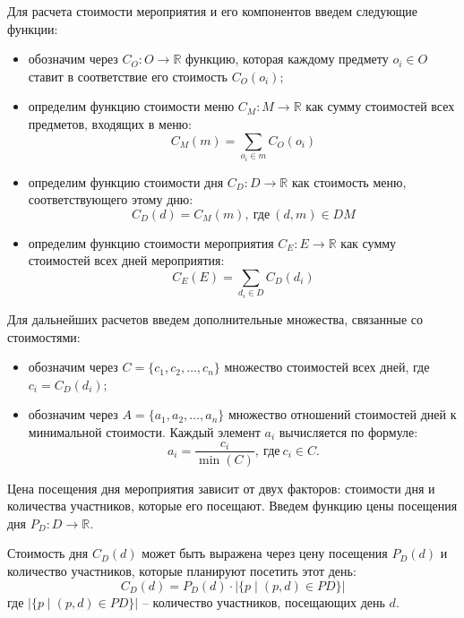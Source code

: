 Для расчета стоимости мероприятия и его компонентов введем следующие функции:
\begin{itemize}[label=--]
	\item обозначим через $C_O: O \rightarrow \mathbb{R}$ функцию, которая каждому предмету $o_i \in O$ ставит в соответствие его стоимость $C_O(o_i)$;
	\item определим функцию стоимости меню $C_M: M \rightarrow \mathbb{R}$ как сумму стоимостей всех предметов, входящих в меню: 
	\begin{equation}
		C_M(m) = \sum_{o_i \in m} C_O(o_i)
	\end{equation}
	\item определим функцию стоимости дня $C_D: D \rightarrow \mathbb{R}$ как стоимость меню, соответствующего этому дню:
	\begin{equation}
		C_D(d) = C_M(m), \ \text{где} \ (d, m) \in DM
	\end{equation}
	\item определим функцию стоимости мероприятия $C_E: E \rightarrow \mathbb{R}$ как сумму стоимостей всех дней мероприятия:
	\begin{equation}
		C_E(E) = \sum_{d_i \in D} C_D(d_i)
	\end{equation}
\end{itemize}

Для дальнейших расчетов введем дополнительные множества, связанные со стоимостями:
\begin{itemize}[label=--]
	\item обозначим через $C = \{c_1, c_2, \dots, c_n\}$ множество стоимостей всех дней, где $c_i = C_D(d_i)$;
	\item обозначим через $A = \{a_1, a_2, \dots, a_n\}$ множество отношений стоимостей дней к минимальной стоимости. Каждый элемент $a_i$ вычисляется по формуле:
	\begin{equation}
		a_i = \frac{c_i}{\min(C)}, \ \text{где} \ c_i \in C.
	\end{equation}
\end{itemize}

Цена посещения дня мероприятия зависит от двух факторов: стоимости дня и количества участников, которые его посещают. Введем функцию цены посещения дня $P_D: D \rightarrow \mathbb{R}$.

Стоимость дня $C_D(d)$ может быть выражена через цену посещения $P_D(d)$ и количество участников, которые планируют посетить этот день:  
\begin{equation}
	C_D(d) = P_D(d) \cdot |\{p \mid (p, d) \in PD\}|
\end{equation}
где $|\{p \mid (p, d) \in PD\}|$ -- количество участников, посещающих день $d$.

